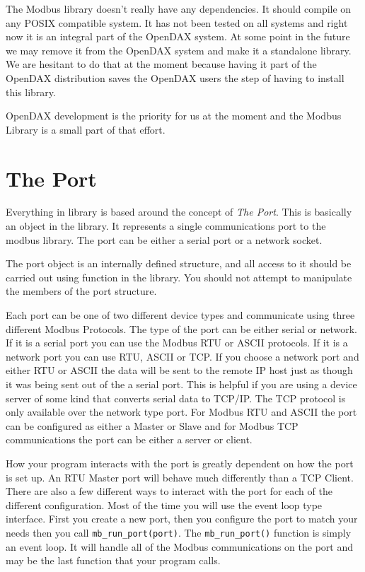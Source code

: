 \documentclass[10pt,letterpaper]{report}
\begin{document}
The Modbus library doesn't really have any dependencies.  It should compile on any POSIX compatible system.  It has not been tested on all systems and right now it is an integral part of the OpenDAX system.  At some point in the future we may remove it from the OpenDAX system and make it a standalone library.  We are hesitant to do that at the moment because having it part of the OpenDAX distribution saves the OpenDAX users the step of having to install this library.

OpenDAX development is the priority for us at the moment and the Modbus Library is a small part of that effort.

\section{The Port}
Everything in library is based around the concept of \textit{The Port}.  This is basically an object in the library.  It represents a single communications port to the modbus library.  The port can be either a serial port or a network socket.

The port object is an internally defined structure, and all access to it should be carried out using function in the library.  You should not attempt to manipulate the members of the port structure.

Each port can be one of two different device types and communicate using three different Modbus Protocols. The type of the port can be either serial or network.  If it is a serial port you can use the Modbus RTU or ASCII protocols.  If it is a network port you can use RTU, ASCII or TCP.  If you choose a network port and either RTU or ASCII the data will be sent to the remote IP host just as though it was being sent out of the a serial port.  This is helpful if you are using a device server of some kind that converts serial data to TCP/IP.  The TCP protocol is only available over the network type port.  For Modbus RTU and ASCII the port can be configured as either a Master or Slave and for Modbus TCP communications the port can be either a server or client.

How your program interacts with the port is greatly dependent on how the port is set up.  An RTU Master port will behave much differently than a TCP Client.  There are also a few different ways to interact with the port for each of the different configuration.  Most of the time you will use the event loop type interface.  First you create a new port, then you configure the port to match your needs then you call \texttt{mb\_run\_port(port)}.  The \texttt{mb\_run\_port()} function is simply an event loop.  It will handle all of the Modbus communications on the port and may be the last function that your program calls.
\end{document}
